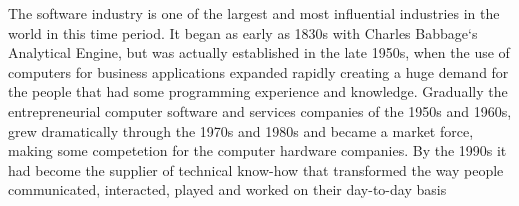 \documentclass[../computer-history.tex]{subfiles}
\begin{document}
\Blindtext
The software industry is one of the largest and most influential industries in the world in this time period. It began as early as 1830s with Charles Babbage‘s Analytical Engine, but was actually established in the late 1950s, when the use of computers for business applications expanded rapidly creating a huge demand for the people that had some programming experience and knowledge. Gradually the entrepreneurial computer software and services companies of the 1950s and 1960s, grew dramatically through the 1970s and 1980s and became a market force, making some competetion for the computer hardware companies. By the 1990s it had become the supplier of technical know-how that transformed the way people communicated, interacted, played and worked on their day-to-day basis

\biblio
\end{document}
